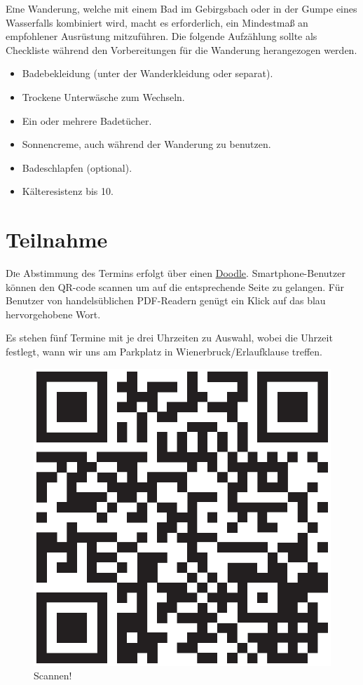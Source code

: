 \documentclass[twoside]{article}
\begin{document}
\begin{multicols}{2}
\lettrine[nindent=0em,lines=3]{E} ine Wanderung, welche mit einem Bad im Gebirgsbach oder in der Gumpe eines Wasserfalls kombiniert wird, macht es erforderlich,
ein Mindestmaß an empfohlener Ausrüstung mitzuführen. Die folgende Aufzählung sollte als Checkliste während den Vorbereitungen für die Wanderung herangezogen
werden.

\begin{itemize}
    \item[\Square] Badebekleidung (unter der Wanderkleidung oder separat).
    \item[\Square] Trockene Unterwäsche zum Wechseln.
    \item[\Square] Ein oder mehrere Badetücher.
    \item[\Square] Sonnencreme, auch während der Wanderung zu benutzen.
    \item[\Square] Badeschlapfen (optional).
    \item[\Square] Kälteresistenz bis 10\celsius.
\end{itemize}


\section{Teilnahme}

\lettrine[nindent=0em,lines=3]{D} ie Abstimmung des Termins erfolgt über einen \href{http://www.doodle.com/m6ywebgyvg6632ig}{Doodle}. Smartphone-Benutzer
können den QR-code scannen um auf die entsprechende Seite zu gelangen. Für Benutzer von handelsüblichen PDF-Readern genügt ein Klick auf das blau hervorgehobene
Wort.

Es stehen fünf Termine mit je drei Uhrzeiten zu Auswahl, wobei die Uhrzeit festlegt, wann wir uns am Parkplatz in Wienerbruck/Erlaufklause treffen.

\begin{figure}[H]
\begin{center}
  \includegraphics[width=.45\textwidth]{Figures/qr-code.eps}
\end{center}
\caption{Scannen!}
\label{fig:qr-codqr-code}
\end{figure}


\end{multicols}
\end{document}
